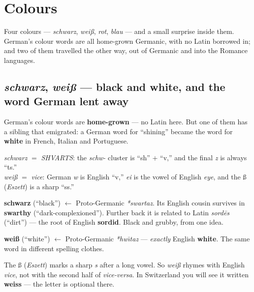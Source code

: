 \chapter{Colours}
\label{ch:colours}

Four colours --- \emph{schwarz}, \emph{wei\ss{}}, \emph{rot}, \emph{blau} ---
and a small surprise inside them. German's colour words are all home-grown
Germanic, with no Latin borrowed in; and two of them travelled the other way,
out of Germanic and into the Romance languages.

\section{\emph{schwarz}, \emph{wei\ss{}} --- black and white, and the word German lent away}
\label{lesson:schwarz-weiss}

German's colour words are \textbf{home-grown} --- no Latin here. But one of them
has a sibling that emigrated: a German word for ``shining'' became the word for
\textbf{white} in French, Italian and Portuguese.

\begin{sounds}
\emph{schwarz} $=$ \emph{SHVARTS}: the \emph{schw-} cluster is ``sh'' $+$ ``v,''
and the final \emph{z} is always ``ts.''\\[3pt]
\emph{wei\ss{}} $=$ \emph{vice}: German \emph{w} is English ``v,'' \emph{ei} is
the vowel of English \emph{eye}, and the \ss{} (\emph{Eszett}) is a sharp ``ss.''
\end{sounds}

\begin{cousinweb}
\textbf{schwarz} (``black'') $\leftarrow$ Proto-Germanic \emph{*swartaz}. Its
English cousin survives in \textbf{swarthy} (``dark-complexioned''). Further
back it is related to Latin \emph{sord\=es} (``dirt'') --- the root of English
\textbf{sordid}. Black and grubby, from one idea.
\end{cousinweb}

\begin{cousinweb}
\textbf{wei\ss{}} (``white'') $\leftarrow$ Proto-Germanic \emph{*hw\=\i taz} ---
\emph{exactly} English \textbf{white}. The same word in different spelling
clothes.
\end{cousinweb}

\begin{sounds}
The \ss{} (\emph{Eszett}) marks a sharp \emph{s} after a long vowel. So
\emph{wei\ss{}} rhymes with English \emph{vice}, not with the second half of
\emph{vice-versa}. In Switzerland you will see it written \textbf{weiss} --- the
letter is optional there.
\end{sounds}

